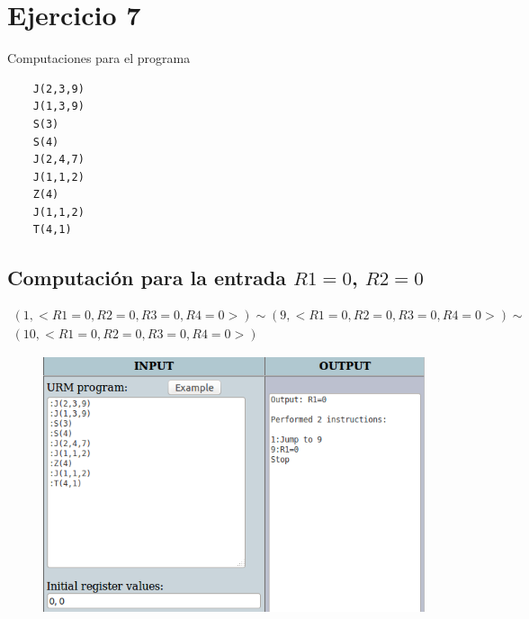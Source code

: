 \section{Ejercicio 7}
	Computaciones para el programa
	\begin{verbatim}
	J(2,3,9)
	J(1,3,9)
	S(3)
	S(4)
	J(2,4,7)
	J(1,1,2)
	Z(4)
	J(1,1,2)
	T(4,1)
	\end{verbatim}
	\subsection{Computación para la entrada $R1=0$, $R2=0$}
	\begin{equation*}\begin{gathered}
	(1, <R1=0, R2=0, R3=0, R4=0>) \sim (9, <R1=0, R2=0, R3=0, R4=0>) \sim\\
	(10, <R1=0, R2=0, R3=0, R4=0>)
	\end{gathered}\end{equation*}
	\begin{figure}[H]
  		\centering
  		\includegraphics[scale=0.5]{images/700.png}
  	\end{figure}
